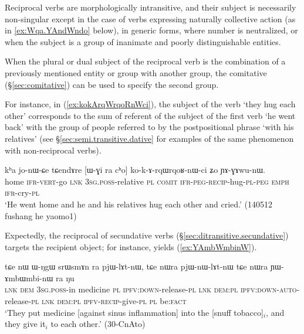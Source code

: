 Reciprocal verbs are morphologically intransitive, and their subject is necessarily non-singular except in the case of verbs expressing naturally collective action \citep[123--127]{kemmer93middle} (as in \ref{ex:Wqa.YAndWndo} below), in generic forms, where number is neutralized, or when the subject is a group of inanimate and poorly distinguishable entities. 

When the plural or dual subject of the reciprocal verb is the combination of a previously mentioned entity or group with another group, the comitative  (§\ref{sec:comitative})  can be used to specify the second group. 


For instance, in (\ref{ex:kokArqWrqoRnWci}), the subject of the verb  `they hug each other' corresponds to the sum of referent of the subject of the first verb  `he went back' with the group of people referred to by the postpositional phrase  `with his relatives' (see §\ref{sec:semi.transitive.dative} for examples of the same phenomenon with non-reciprocal verbs).

\begin{exe}
\ex \label{ex:kokArqWrqoRnWci}
\gll   kʰa jo-nɯ-ɕe tɕendɤre [ɯ-ɣi ra cʰo] ko-k-ɤ-rqɯ\redp{}rqoʁ-nɯ-ci ʑo ɲɤ-ɣɤwu-nɯ. \\
home \textsc{ifr}-\textsc{vert}-go \textsc{lnk} \textsc{3sg}.\textsc{poss}-relative \textsc{pl} \textsc{comit} \textsc{ifr}-\textsc{peg}-\textsc{recip}-hug-\textsc{pl}-\textsc{peg} \textsc{emph} \textsc{ifr}-cry-\textsc{pl} \\
\glt `He went home and he and his relatives hug each other and cried.' (140512 fushang he yaomo1)
\end{exe}

Expectedly, the reciprocal of secundative verbs (§\ref{sec:ditransitive.secundative}) targets the recipient object; for instance,  yields  (\ref{ex:YAmbWmbinW}).

\begin{exe}
\ex \label{ex:YAmbWmbinW}
\gll tɕe nɯ ɯ-ŋgɯ srɯsmɤn ra pjɯ-lɤt-nɯ, tɕe nɯra pjɯ-nɯ-lɤt-nɯ tɕe nɯra ɲɯ-ɤmbɯ\redp{}mbi-nɯ ra ŋu \\
\textsc{lnk} \textsc{dem} \textsc{3sg}.\textsc{poss}-in medicine \textsc{pl} \textsc{ipfv}:\textsc{down}-release-\textsc{pl} \textsc{lnk} \textsc{dem}:\textsc{pl} \textsc{ipfv}:\textsc{down}-\textsc{auto}-release-\textsc{pl} \textsc{lnk} \textsc{dem}:\textsc{pl} \textsc{ipfv}-\textsc{recip}-give-\textsc{pl} \textsc{pl} be:\textsc{fact} \\
\glt `They put medicine [against sinus inflammation] into the [snuff tobacco]$_i$, and they give it$_i$ to each other.' (30-CnAto)
\end{exe}
 
